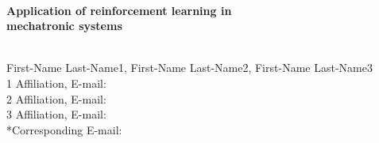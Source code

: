 \documentclass[10pt,a4paper]{report}  %
\begin{document}
\begin{center}
\quad \\[1pt]
\fontsize{22pt}{3pt}\selectfont\hspace{0.35cm}\textbf{\sectionef Application of reinforcement learning in \\[12pt]
 mechatronic systems}\\[12pt]
\end{center}
\begin{center}
\qquad \\[27pt]
First-Name Last-Name1, First-Name Last-Name2, First-Name Last-Name3\\[12pt]
1 Affiliation, E-mail:\\[6pt]
2 Affiliation, E-mail:\\[6pt]
3 Affiliation, E-mail:\\[6pt]
*Corresponding E-mail: \\
\qquad \\
\end{center}
\fontsize{10pt}{13pt}\selectfont







\end{document}
